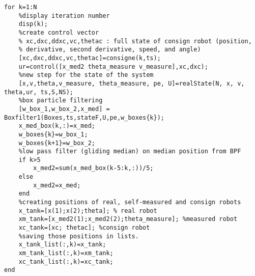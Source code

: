 {\small
\begin{lstlisting}[frame=single]
for k=1:N
    %display iteration number
    disp(k);
    %create control vector
    % xc,dxc,ddxc,vc,thetac : full state of consign robot (position,
    % derivative, second derivative, speed, and angle)
    [xc,dxc,ddxc,vc,thetac]=consigne(k,ts);
    ur=control([x_med2 theta_measure v_measure],xc,dxc);
    %new step for the state of the system
    [x,v,theta,v_measure, theta_measure, pe, U]=realState(N, x, v, theta,ur, ts,S,NS);
    %box particle filtering
    [w_box_1,w_box_2,x_med] = Boxfilter1(Boxes,ts,stateF,U,pe,w_boxes{k});
    x_med_box(k,:)=x_med;
    w_boxes{k}=w_box_1;
    w_boxes{k+1}=w_box_2;
    %low pass filter (gliding median) on median position from BPF
    if k>5
        x_med2=sum(x_med_box(k-5:k,:))/5;
    else
        x_med2=x_med;
    end
    %creating positions of real, self-measured and consign robots
    x_tank=[x(1);x(2);theta]; % real robot
    xm_tank=[x_med2(1);x_med2(2);theta_measure]; %measured robot
    xc_tank=[xc; thetac]; %consign robot
    %saving those positions in lists.
    x_tank_list(:,k)=x_tank;
    xm_tank_list(:,k)=xm_tank;
    xc_tank_list(:,k)=xc_tank;
end
\end{lstlisting}
}
